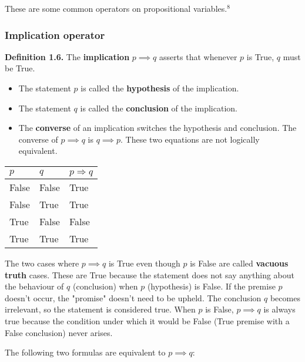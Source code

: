 \documentclass{article}
\begin{document}
These are some common operators on propositional variables.$^{8}$ 

\subsubsection*{Implication operator}
\textbf{Definition 1.6.} The \textbf{implication} $p \implies q $ asserts 
that whenever $p$ is True, $q$ must be True. 
\begin{itemize}[itemsep=0pt] 
    \renewcommand{\labelitemi}{} %
    \footnotesize %
    \item The statement $p$ is called the \textbf{hypothesis} of the implication.
    \item The statement $q$ is called the \textbf{conclusion} of the implication.
    \item The \textbf{converse} of an implication switches
    the hypothesis and conclusion. The converse of $p \implies q$ is $q \implies p$.
    These two equations are not logically equivalent.
\end{itemize}



\begin{center}
    
\begin{tabular}{|p{1cm} p{1cm} p{1cm}|}
    \hline
    $p$ & $q$ & $p \Rightarrow q$ \\
    \hline 
    False & False & True \\
    False & True & True \\
    True & False & False \\
    True & True & True \\
    \hline   
\end{tabular}
\end{center}



The two cases where $ p \implies q$ is True even though $p$ is False are
called \textbf{vacuous truth} cases. These are True because the statement
does not say anything about the behaviour of $q$ (conclusion) when $p$ (hypothesis) is False. 
If the premise $p$ doesn't occur, the "promise" doesn't need to be upheld. The conclusion  
$q$ becomes irrelevant, so the statement is considered true. When $p$ is False, 
$ p \implies q$ is always true because the condition under which it would be False 
(True premise with a False conclusion) never arises.


The following two formulas are equivalent to $p \implies q$:
\end{document}
